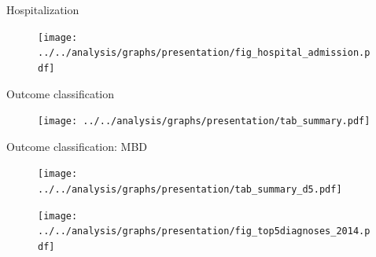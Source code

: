 \documentclass[aspectratio=169,handout]{beamer} %
\begin{document}

\begin{frame}{Hospitalization}\label{DESCRIPTIVES}
	\begin{figure}
		\texttt{[image: ../../analysis/graphs/presentation/fig\_hospital\_admission.pdf]}
	\end{figure}
	\hyperlink{DATA}{}
\end{frame}


\begin{frame}{Outcome classification}
\label{ICD10 CLASSIFICATION}
\begin{figure}
	\texttt{[image: ../../analysis/graphs/presentation/tab\_summary.pdf]}
\end{figure}
\hyperlink{VARIABLES}{}
\end{frame}

\begin{frame}{Outcome classification: MBD}
\begin{figure}
	\texttt{[image: ../../analysis/graphs/presentation/tab\_summary\_d5.pdf]}
\end{figure}
\hyperlink{VARIABLES}{}
\end{frame}


\begin{frame}
\label{5 MOST COMMON DIAGNOSES}
\begin{figure}
	\texttt{[image: ../../analysis/graphs/presentation/fig\_top5diagnoses\_2014.pdf]}
\end{figure}
\vspace{-1em}
\hyperlink{VARIABLES}{}
\end{frame}


\end{document}
